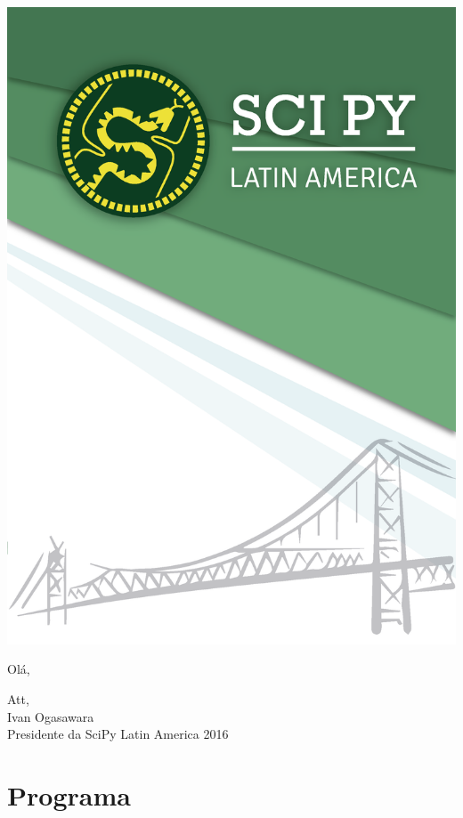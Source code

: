 \documentclass[12pt]{article}
\begin{document}
\thispagestyle{empty}
\noindent  %
\includegraphics{../../assets/capa}
\NoBgThispage

\clearpage

\restoregeometry

\newpage

Olá,

Att, \\
\indent Ivan Ogasawara \\
\indent Presidente da SciPy Latin America 2016


\newpage

\section*{Programa}
\end{document}
